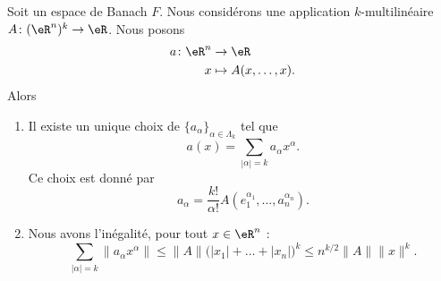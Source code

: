 \begin{lemma}	\label{LEMooIEXNooPOHokX}
	Soit un espace de Banach \( F\). Nous considérons une application \( k\)-multilinéaire \(A \colon (\eR^n)^k\to \eR  \). Nous posons
	\begin{equation}
		\begin{aligned}
			a\colon \eR^n & \to \eR                \\
			x             & \mapsto A(x,\ldots,x).
		\end{aligned}
	\end{equation}
	Alors
	\begin{enumerate}
		\item		\label{ITEMooHELXooHqYioG}
		      Il existe un unique choix de \( \{ a_{\alpha} \}_{\alpha\in\Lambda_k}\) tel que
		      \begin{equation}
			      a(x)=\sum_{| \alpha |=k}a_{\alpha}x^{\alpha}.
		      \end{equation}
		      Ce choix est donné par
		      \begin{equation}
			      a_{\alpha}=\frac{ k! }{ \alpha! }A(e_1^{\alpha_1},\ldots,a_n^{\alpha_n}).
		      \end{equation}
		\item		\label{ITEMooHMZUooGjtmEB}
		      Nous avons l'inégalité, pour tout \( x\in \eR^n\) :
		      \begin{equation}
			      \sum_{| \alpha |=k}\| a_{\alpha}x^{\alpha} \|\leq \| A \|\big( | x_1 |+\ldots+| x_n | \big)^k\leq n^{k/2}\| A \|\| x \|^k.
		      \end{equation}
	\end{enumerate}
\end{lemma}

